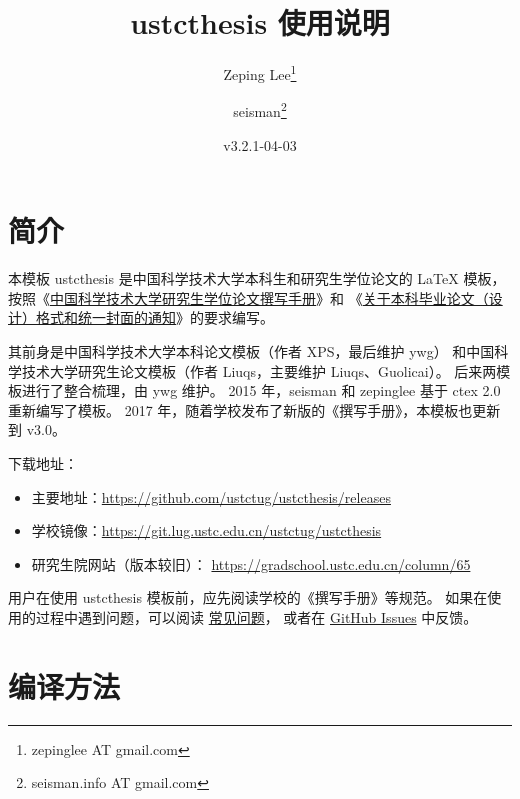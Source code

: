 \documentclass[a4paper]{ltxdoc}
\DeclareRobustCommand\pkg{\textsf}
\DeclareRobustCommand\cls{\textsf}
\begin{document}
\title{\cls{ustcthesis} 使用说明}
\author{Zeping Lee\thanks{zepinglee AT gmail.com} \and
        seisman\thanks{seisman.info AT gmail.com} }
\date{v3.2.1-04-03}
\maketitle



\section{简介}

本模板 \cls{ustcthesis} 是中国科学技术大学本科生和研究生学位论文的 \LaTeX{}
模板， 按照《\href{http://gradschool.ustc.edu.cn/static/oldsite/ylb/material/xw/wdxz/32.pdf}
{中国科学技术大学研究生学位论文撰写手册}》和
《\href{https://www.teach.ustc.edu.cn/notice/notice-teaching/11530.html}
{关于本科毕业论文（设计）格式和统一封面的通知}》的要求编写。

其前身是中国科学技术大学本科论文模板（作者 XPS，最后维护 ywg）
和中国科学技术大学研究生论文模板（作者 Liuqs，主要维护 Liuqs、Guolicai）。
后来两模板进行了整合梳理，由 ywg 维护。
2015 年，seisman 和 zepinglee 基于 \pkg{ctex} 2.0 重新编写了模板。
2017 年，随着学校发布了新版的《撰写手册》，本模板也更新到 v3.0。

下载地址：
\begin{itemize}
  \item 主要地址：\url{https://github.com/ustctug/ustcthesis/releases}
  \item 学校镜像：\url{https://git.lug.ustc.edu.cn/ustctug/ustcthesis}
  \item 研究生院网站（版本较旧）：
    \url{https://gradschool.ustc.edu.cn/column/65}
\end{itemize}

用户在使用 \pkg{ustcthesis} 模板前，应先阅读学校的《撰写手册》等规范。
如果在使用的过程中遇到问题，可以阅读
\href{https://github.com/ustctug/ustcthesis/wiki}{常见问题}，
或者在 \href{https://github.com/ustctug/ustcthesis/issues}{GitHub Issues}
中反馈。



\section{编译方法}
\end{document}
